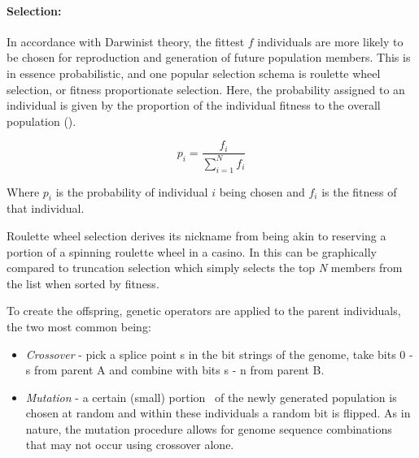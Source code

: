 \paragraph{Selection:}

In accordance with Darwinist theory, the fittest $f$ individuals are more likely to be chosen for reproduction and generation of future population members. This is in essence probabilistic, and one popular selection schema is roulette wheel selection, or fitness proportionate selection. Here, the probability assigned to an individual is given by the proportion of the individual fitness to the overall population ().

\begin{equation}
\label{eq:roulette}	
p_{i}=\frac{f_{i}}{\sum_{i=1}^{N}f_{i}}
\end{equation}

Where $p_i$ is the probability of individual $i$ being chosen and $f_i$ is the fitness of that individual.

Roulette wheel selection derives its nickname from being akin to reserving a portion of a spinning roulette wheel in a casino. In  this can be graphically compared to truncation selection which simply selects the top \textit{N} members from the list when sorted by fitness.

To create the offspring, genetic operators are applied to the parent individuals, the two most common being:
\begin{itemize}
	\item \textit{Crossover} - pick a splice point s in the bit strings of the genome, take bits 0 - s from parent A and combine with bits s - n from parent B.

	\item \textit{Mutation} - a certain (small) portion \ of the newly generated population is chosen at random and within these individuals a random bit is flipped. As in nature, the mutation procedure allows for genome sequence combinations that may not occur using crossover alone.
\end{itemize}

